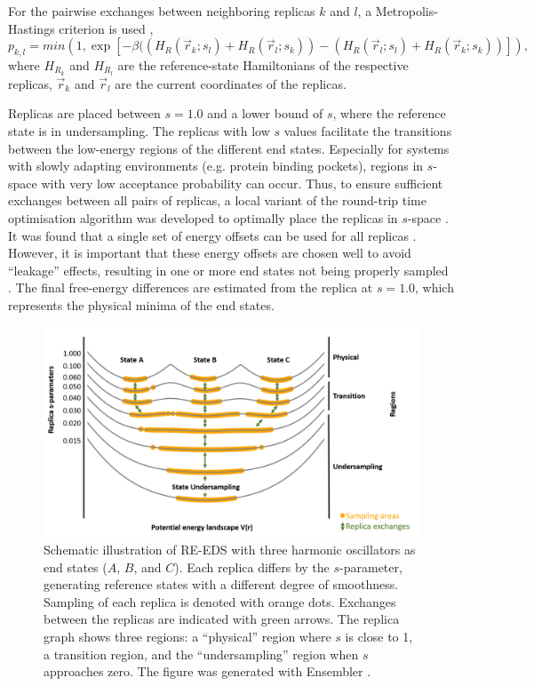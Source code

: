 For the pairwise exchanges between neighboring replicas $k$ and $l$, a Metropolis-Hastings criterion \cite{Hastings1970} is used \cite{Sidler2016,Sugita2000},
\begin{equation}
    p_{k,l} = min\left(1, \exp \left[-\beta ((H_{R}(\vec{r}_k; s_l)+H_{R}(\vec{r}_l; s_k))-(H_{R}(\vec{r}_l; s_l)+H_{R}(\vec{r}_k; s_k)) \right] \right) ,
\end{equation}
where $H_{R_k}$ and $H_{R_l}$ are the reference-state Hamiltonians of the respective replicas, $\vec{r}_k$ and $\vec{r}_l$ are the current coordinates of the replicas.

Replicas are placed between $s=1.0$ and a lower bound of $s$, where the reference state is in undersampling. The replicas with low $s$ values facilitate the transitions between the low-energy regions of the  different end states. Especially for systems with slowly adapting environments (e.g. protein binding pockets), regions in $s$-space with very low acceptance probability can occur. Thus, to ensure sufficient exchanges between all pairs of replicas, a local variant of the round-trip time optimisation algorithm \cite{Katzgraber2006, Nadler2008} was developed to optimally place the replicas in $s$-space \cite{Sidler2017}.
It was found that a single set of energy offsets can be used for all replicas \cite{Sidler2016}. However, it is important that these energy offsets are chosen well to avoid ``leakage'' effects, resulting in one or more end states not being properly sampled \cite{Sidler2016}.
The final free-energy differences are estimated from the replica at $s=1.0$, which represents the physical minima of the end states.

\begin{figure}[h]
    \centering
    \includegraphics[width=\columnwidth]{fig/theory/Reeds_scheme_first.png}
    \caption{Schematic illustration of RE-EDS with three harmonic oscillators as end states ($A$, $B$, and $C$). Each replica differs by the $s$-parameter, generating reference states with a different degree of smoothness. Sampling of each replica is denoted with orange dots. Exchanges between the replicas are indicated with green arrows. The replica graph shows three regions: a ``physical'' region where $s$ is close to 1, a transition region, and the ``undersampling'' region when $s$ approaches zero. The figure was generated with Ensembler \cite{ries2021a}.}
    \label{fig:RE-EDS_Scheme}
\end{figure}

